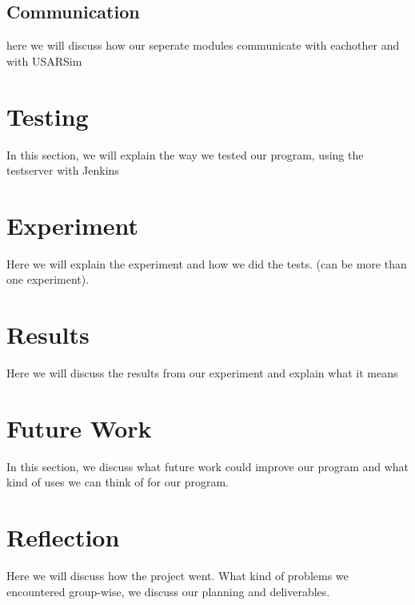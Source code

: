 \documentclass[a4paper,10pt]{article}
\begin{document}
\subsection{Communication}
here we will discuss how our seperate modules communicate with eachother and with USARSim

\section{Testing}
In this section, we will explain the way we tested our program, using the testserver with Jenkins

\section{Experiment}
Here we will explain the experiment and how we did the tests. (can be more than one experiment).

\section{Results}
Here we will discuss the results from our experiment and explain what it means

\section{Future Work}
In this section, we discuss what future work could improve our program and what kind of uses we can think of for our program.

\section{Reflection}
Here we will discuss how the project went. What kind of problems we encountered group-wise, we discuss our planning and deliverables.
\end{document}

